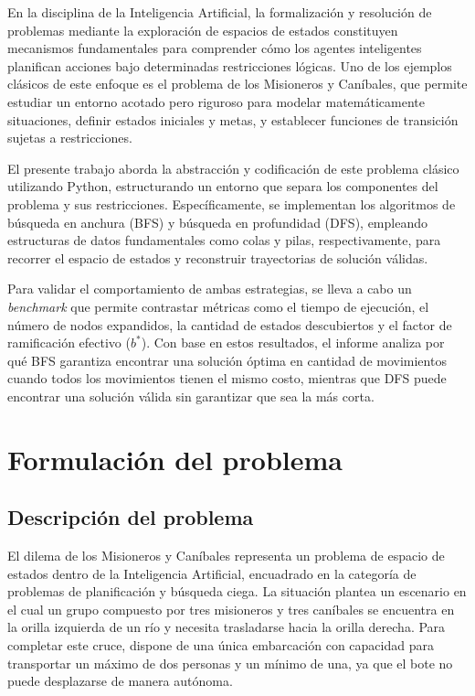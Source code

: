 \documentclass[
  spanish,
  11pt,
]{article}
\begin{document}
En la disciplina de la Inteligencia Artificial, la formalización y
resolución de problemas mediante la exploración de espacios de estados
constituyen mecanismos fundamentales para comprender cómo los agentes
inteligentes planifican acciones bajo determinadas restricciones
lógicas. Uno de los ejemplos clásicos de este enfoque es el problema de
los Misioneros y Caníbales, que permite estudiar un entorno acotado pero
riguroso para modelar matemáticamente situaciones, definir estados
iniciales y metas, y establecer funciones de transición sujetas a
restricciones.

El presente trabajo aborda la abstracción y codificación de este
problema clásico utilizando Python, estructurando un entorno que separa
los componentes del problema y sus restricciones. Específicamente, se
implementan los algoritmos de búsqueda en anchura (BFS) y búsqueda en
profundidad (DFS), empleando estructuras de datos fundamentales como
colas y pilas, respectivamente, para recorrer el espacio de estados y
reconstruir trayectorias de solución válidas.

Para validar el comportamiento de ambas estrategias, se lleva a cabo un
\emph{benchmark} que permite contrastar métricas como el tiempo de
ejecución, el número de nodos expandidos, la cantidad de estados
descubiertos y el factor de ramificación efectivo (\(b^{*}\)). Con base
en estos resultados, el informe analiza por qué BFS garantiza encontrar
una solución óptima en cantidad de movimientos cuando todos los
movimientos tienen el mismo costo, mientras que DFS puede encontrar una
solución válida sin garantizar que sea la más corta.

\section{Formulación del problema}\label{formulaciuxf3n-del-problema}

\subsection{Descripción del problema}\label{descripciuxf3n-del-problema}

El dilema de los Misioneros y Caníbales representa un problema de
espacio de estados dentro de la Inteligencia Artificial, encuadrado en
la categoría de problemas de planificación y búsqueda ciega. La
situación plantea un escenario en el cual un grupo compuesto por tres
misioneros y tres caníbales se encuentra en la orilla izquierda de un
río y necesita trasladarse hacia la orilla derecha. Para completar este
cruce, dispone de una única embarcación con capacidad para transportar
un máximo de dos personas y un mínimo de una, ya que el bote no puede
desplazarse de manera autónoma.
\end{document}
